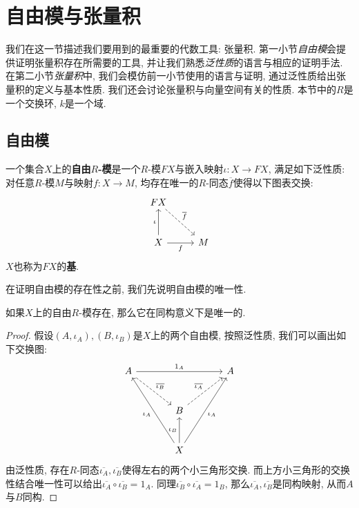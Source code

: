 \section{自由模与张量积}
我们在这一节描述我们要用到的最重要的代数工具: 张量积.
第一小节\textit{自由模}会提供证明张量积存在所需要的工具, 并让我们熟悉\textit{泛性质}的语言与相应的证明手法.
在第二小节\textit{张量积}中, 我们会模仿前一小节使用的语言与证明, 通过泛性质给出张量积的定义与基本性质.
我们还会讨论张量积与向量空间有关的性质.
本节中的$R$是一个交换环, $k$是一个域.

\subsection*{自由模}
\begin{defn}
    一个集合$X$上的\textbf{自由$R$-模}是一个$R$-模$FX$与嵌入映射$\iota:X\to FX$, 满足如下泛性质:
    对任意$R$-模$M$与映射$f:X\to M$, 均存在唯一的$R$-同态$\overline{f}$使得以下图表交换:
    \[\begin{tikzcd}[row sep=large]
        FX \arrow[dr, dashed, "\overline{f}"]\\
        X \arrow[u, "\iota"] \arrow[r, "f"'] & M
    \end{tikzcd}\]
    $X$也称为$FX$的\textbf{基}.
\end{defn}

在证明自由模的存在性之前, 我们先说明自由模的唯一性.
\begin{prop}\label{uniqueness of free module}
    如果$X$上的自由$R$-模存在, 那么它在同构意义下是唯一的.
\end{prop}
\begin{proof}
    假设$(A,\iota_A),(B,\iota_B)$是$X$上的两个自由模, 按照泛性质, 我们可以画出如下交换图:
    \begin{equation*}
        \begin{tikzcd}[sep=large]
            A \arrow[rr, "1_A"] \arrow[dr, dashed, "\overline{\iota_B}"] & & A\\
            & B \arrow[ur, dashed, "\overline{\iota_A}"] &\\
            & X \arrow[uul, "\iota_A"] \arrow[u, "\iota_B"] \arrow[uur, "\iota_A"'] &
        \end{tikzcd}
    \end{equation*}
    由泛性质, 存在$R$-同态$\overline{\iota_A},\overline{\iota_B}$使得左右的两个小三角形交换.
    而上方小三角形的交换性结合唯一性可以给出$\overline{\iota_A}\circ\overline{\iota_B}=1_A$.
    同理$\overline{\iota_B}\circ\overline{\iota_A}=1_B$, 那么$\overline{\iota_A},\overline{\iota_B}$是同构映射, 从而$A$与$B$同构.
\end{proof}

